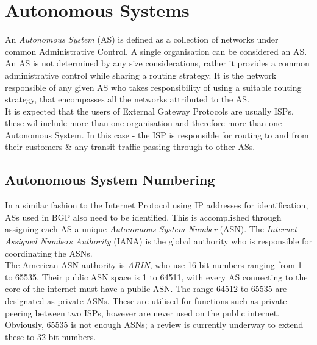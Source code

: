 \section{Autonomous Systems}
An \textit{Autonomous System} (AS) is defined as a collection of networks under common Administrative Control. A single organisation can be considered an AS. An AS is not determined by any size considerations, rather it provides a common administrative control while sharing a routing strategy. It is the network responsible of any given AS who takes responsibility of using a suitable routing strategy, that encompasses all the networks attributed to the AS.\\

It is expected that the users of External Gateway Protocols are usually ISPs, these wil include more than one organisation and therefore more than one Autonomous System. In this case - the ISP is responsible for routing to and from their customers \& any transit traffic passing through to other ASs.

\subsection{Autonomous System Numbering}
In a similar fashion to the Internet Protocol using IP addresses for identification, ASs used in BGP also need to be identified. This is accomplished through assigning each AS a unique \textit{Autonomous System Number} (ASN). The \textit{Internet Assigned Numbers Authority} (IANA) is the global authority who is responsible for coordinating the ASNs.\\

The American ASN authority is \textit{ARIN}, who use 16-bit numbers ranging from 1 to 65535. Their public ASN space is 1 to 64511, with every AS connecting to the core of the internet must have a public ASN. The range 64512 to 65535 are designated as private ASNs. These are utilised for functions such as private peering between two ISPs, however are never used on the public internet. Obviously, 65535 is not enough ASNs; a review is currently underway to extend these to 32-bit numbers. 

